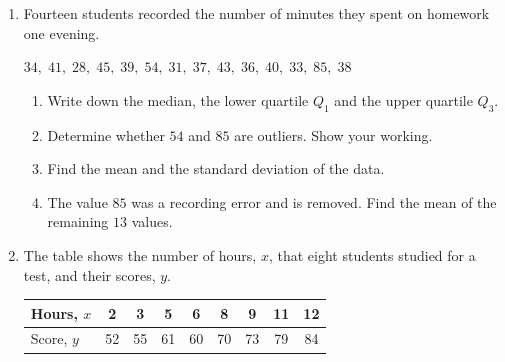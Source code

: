 \documentclass[12pt, twoside]{article}
\begin{document}
\begin{enumerate}[itemsep=0.15cm]

\newpage

\item[5.]
Fourteen students recorded the number of minutes they spent on homework
one evening.

\begin{center}
$34,\; 41,\; 28,\; 45,\; 39,\; 54,\; 31,\; 37,\; 43,\; 36,\; 40,\; 33,\;
85,\; 38$
\end{center}

\begin{enumerate}[itemsep=0.1cm]
  \item Write down the median, the lower quartile $Q_{1}$ and the upper
  quartile $Q_{3}$.
  \item Determine whether $54$ and $85$ are outliers. Show your working.
  \item Find the mean and the standard deviation of the data.
  \item The value $85$ was a recording error and is removed. Find the
  mean of the remaining $13$ values.
\end{enumerate}


\newpage

\item[6.]
The table shows the number of hours, $x$, that eight students studied for
a test, and their scores, $y$.

\begin{center}
\setlength{\tabcolsep}{7pt}\renewcommand{\arraystretch}{1.2}
\begin{tabular}{|l|c|c|c|c|c|c|c|c|}
\hline
Hours, $x$ & 2 & 3 & 5 & 6 & 8 & 9 & 11 & 12 \\
\hline
Score, $y$ & 52 & 55 & 61 & 60 & 70 & 73 & 79 & 84 \\
\hline
\end{tabular}
\end{center}


\end{enumerate}
\end{document}
